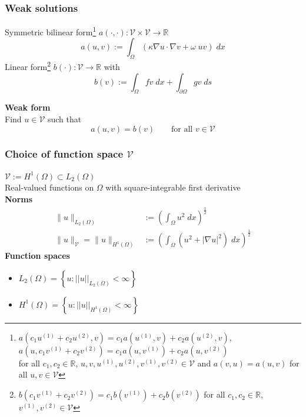\documentclass{beamer}
\begin{document}

\begin{frame}
\frametitle{Weak solutions}

Symmetric bilinear form\footnote{
  {\tiny
  $a(c_1 u^{(1)} + c_2 u^{(2)},v) = c_1 a(u^{(1)},v) + c_2 a(u^{(2)},v)$, $a(u,c_1 v^{(1)} + c_2 v^{(2)}) = c_1 a(u,v^{(1)}) + c_2 a(u,v^{(2)})$\\for all $c_1,c_2\in \mathbb{R}$, $u,v,u^{(1)},u^{(2)},v^{(1)}, v^{(2)} \in \mathcal{V}$ and $a(v,u) = a(u,v)$ for all $u,v\in \mathcal{V}$}} $a(\cdot,\cdot): \mathcal{V}\times \mathcal{V} \rightarrow \mathbb{R}$
$$
a(u,v) := \int_\Omega \left(\kappa \nabla u \cdot \nabla  v + \omega\; u v\right)\;dx
$$
Linear form\footnote{{\tiny
$b(c_1 v^{(1)} + c_2 v^{(2)})=c_1b( v^{(1)}) + c_2 b(v^{(2)})$ for all $c_1,c_2\in \mathbb{R}$, $v^{(1)}, v^{(2)} \in \mathcal{V}$
}} $b(\cdot):\mathcal{V}\rightarrow \mathbb{R}$ with
$$
b(v) := \int_\Omega f v\;dx+ \int_{\partial \Omega} g v\;ds
$$

\textbf{Weak form}\\
Find $u \in \mathcal{V}$ such that
$$
a(u,v) = b(v) \qquad \text{for all $v \in \mathcal{V}$}
$$
\end{frame}


\begin{frame}
\frametitle{Choice of function space $\mathcal{V}$}
$\mathcal{V}:=H^1(\Omega)\subset L_2(\Omega)$\\
Real-valued functions on $\Omega$ with square-integrable first derivative\\[1ex]
\textbf{Norms}
$$
\begin{aligned}
\| u\|_{L_2(\Omega)} &:= \left(\int_\Omega u^2\;dx\right)^{\frac{1}{2}}\\
\| u\|_{\mathcal{V}} = \| u\|_{H^1(\Omega)} &:= \left(\int_\Omega \left(u^2+|\nabla u|^2\right)\;dx\right)^{\frac{1}{2}}
\end{aligned}
$$
\textbf{Function spaces}
\begin{itemize}
\item $L_2(\Omega) = \left\{u : ||u||_{L_2(\Omega)}<\infty\right\}$
\item $H^1(\Omega) = \left\{u : ||u||_{H^1(\Omega)}<\infty\right\}$
\end{itemize}
\end{frame}

\end{document}
